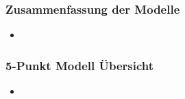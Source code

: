 \documentclass[12pt,a4paper]{beamer}
\begin{document}
\begin{frame}
	\frametitle{Zusammenfassung der Modelle}
	\begin{itemize}
		\item 
	\end{itemize}
\end{frame}

\begin{frame}
	\frametitle{5-Punkt Modell Übersicht}
	\begin{itemize}
		\item 
	\end{itemize}
\end{frame}


\end{document}
